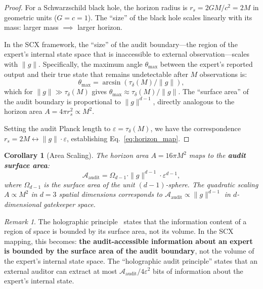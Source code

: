 \documentclass[12pt,a4paper]{article}
\newtheorem{corollary}[theorem]{Corollary}
\theoremstyle{remark}
\newtheorem{remark}[theorem]{Remark}
\newcommand{\SCX}{\textsf{SCX}}
\begin{document}
\begin{proof}
For a Schwarzschild black hole, the horizon radius is $r_s = 2GM/c^2 = 2M$ in geometric units ($G = c = 1$). The ``size'' of the black hole scales linearly with its mass: larger mass $\implies$ larger horizon.

In the \SCX{} framework, the ``size'' of the audit boundary---the region of the expert's internal state space that is inaccessible to external observation---scales with $\|g\|$. Specifically, the maximum angle $\theta_{\max}$ between the expert's reported output and their true state that remains undetectable after $M$ observations is:
\begin{equation}
  \theta_{\max} = \arcsin(\tau_{\delta}(M) / \|g\|),
\end{equation}
which for $\|g\| \gg \tau_{\delta}(M)$ gives $\theta_{\max} \approx \tau_{\delta}(M) / \|g\|$. The ``surface area'' of the audit boundary is proportional to $\|g\|^{d-1}$, directly analogous to the horizon area $A = 4\pi r_s^2 \propto M^2$.

Setting the audit Planck length to $\varepsilon = \tau_{\delta}(M)$, we have the correspondence $r_s = 2M \leftrightarrow \|g\| \cdot \varepsilon$, establishing Eq.~\eqref{eq:horizon_map}.
\end{proof}

\begin{corollary}[Area Scaling]
\label{cor:area_scaling}
The horizon area $A = 16\pi M^2$ maps to the \textbf{audit surface area}:
\begin{equation}
  \mathcal{A}_{\text{audit}} = \Omega_{d-1} \cdot \|g\|^{d-1} \cdot \varepsilon^{d-1},
\end{equation}
where $\Omega_{d-1}$ is the surface area of the unit $(d-1)$-sphere. The quadratic scaling $A \propto M^2$ in $d = 3$ spatial dimensions corresponds to $\mathcal{A}_{\text{audit}} \propto \|g\|^{d-1}$ in $d$-dimensional gatekeeper space.
\end{corollary}

\begin{remark}
\label{rem:holography_audit}
The holographic principle~\cite{thooft1993dimensional,susskind1995world} states that the information content of a region of space is bounded by its surface area, not its volume. In the \SCX{} mapping, this becomes: \textbf{the audit-accessible information about an expert is bounded by the surface area of the audit boundary}, not the volume of the expert's internal state space. The ``holographic audit principle'' states that an external auditor can extract at most $\mathcal{A}_{\text{audit}} / 4\varepsilon^2$ bits of information about the expert's internal state.
\end{remark}
\end{document}
